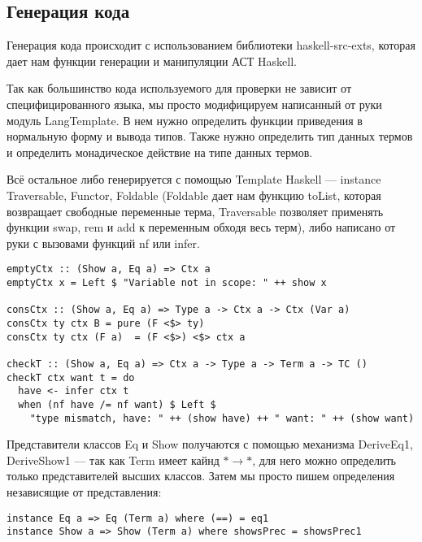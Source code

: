 \subsection{Генерация кода}
Генерация кода происходит с использованием библиотеки haskell-src-exts\cite{src_exts}, которая дает нам функции генерации и манипуляции АСТ Haskell.

Так как большинство кода используемого для проверки не зависит от специфицированного языка, мы просто модифицируем написанный от руки модуль LangTemplate. В нем нужно определить функции приведения в нормальную форму и вывода типов. Также нужно определить тип данных термов и определить монадическое действие на типе данных термов.

Всё остальное либо генерируется с помощью Template Haskell\cite{TH} --- instance Traversable\cite{deriveFun}, Functor, Foldable (Foldable дает нам функцию toList, которая возвращает свободные переменные терма, Traversable позволяет применять функции swap, rem и add  к переменным обходя весь терм), либо написано от руки с вызовами функций nf или infer.

\begin{lstlisting}[caption={Проверка типов и контексты},captionpos=b, frame=single, float,floatplacement=H]
emptyCtx :: (Show a, Eq a) => Ctx a
emptyCtx x = Left $ "Variable not in scope: " ++ show x

consCtx :: (Show a, Eq a) => Type a -> Ctx a -> Ctx (Var a)
consCtx ty ctx B = pure (F <$> ty)
consCtx ty ctx (F a)  = (F <$>) <$> ctx a

checkT :: (Show a, Eq a) => Ctx a -> Type a -> Term a -> TC ()
checkT ctx want t = do
  have <- infer ctx t
  when (nf have /= nf want) $ Left $
    "type mismatch, have: " ++ (show have) ++ " want: " ++ (show want)
\end{lstlisting}

Представители классов Eq и Show получаются с помощью механизма DeriveEq1, DeriveShow1\cite{deriveCompat} --- так как Term имеет кайнд $* \rightarrow *$, для него можно определить только представителей высших классов\cite{prel_extras}. Затем мы просто пишем определения независящие от представления:

\begin{lstlisting}[caption={Определение представителей классов Eq и Show для представления АСТ}, captionpos=b, frame=single, float,floatplacement=H]
instance Eq a => Eq (Term a) where (==) = eq1
instance Show a => Show (Term a) where showsPrec = showsPrec1
\end{lstlisting}

